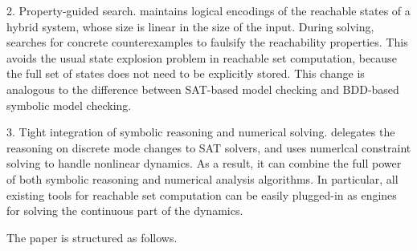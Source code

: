 2. Property-guided search. \dReach{} maintains logical encodings of the reachable states of 
a hybrid system, whose size is linear in the size of the input. During solving, \dReach{} searches for concrete 
counterexamples to faulsify the reachability properties. This avoids the usual state explosion problem
in reachable set computation, because the full set of states does not need to be explicitly stored. This change 
is analogous to the difference between SAT-based model checking and BDD-based symbolic model checking. 

3. Tight integration of symbolic reasoning and numerical solving. \dReach{} delegates the 
reasoning on discrete mode changes to SAT solvers, and uses numerlcal constraint solving to handle nonlinear dynamics. 
As a result, it can combine the full power of both symbolic reasoning and numerical analysis algorithms. In particular, 
all existing tools for reachable set computation can be easily plugged-in as engines for solving 
the continuous part of the dynamics. 

The paper is structured as follows.




\newpage
